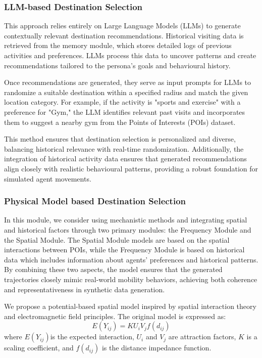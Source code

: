 \subsubsection{LLM-based Destination Selection}
This approach relies entirely on Large Language Models (LLMs) to generate contextually relevant destination recommendations. Historical visiting data is retrieved from the memory module, which stores detailed logs of previous activities and preferences. LLMs process this data to uncover patterns and create recommendations tailored to the persona's goals and behavioural history.

Once recommendations are generated, they serve as input prompts for LLMs to randomize a suitable destination within a specified radius and match the given location category. 
For example, if the activity is "sports and exercise" with a preference for "Gym," the LLM identifies relevant past visits and incorporates them to suggest a nearby gym from the Points of Interests (POIs) dataset.

This method ensures that destination selection is personalized and diverse, balancing historical relevance with real-time randomization. Additionally, the integration of historical activity data ensures that generated recommendations align closely with realistic behavioural patterns, providing a robust foundation for simulated agent movements.

\subsubsection{Physical Model based Destination Selection}
In this module, we consider using mechanistic methods and integrating spatial and historical factors through two primary modules: the Frequency Module and the Spatial Module. The Spatial Module models are based on the spatial interactions between POIs, while the Frequency Module is based on historical data which includes information about agents' preferences and historical patterns. By combining these two aspects, the model ensures that the generated trajectories closely mimic real-world mobility behaviors, achieving both coherence and representativeness in synthetic data generation.

We propose a potential-based spatial model inspired by spatial interaction theory and electromagnetic field principles. The original model is expressed as:
\begin{equation} 
    E(Y_{ij}) = K U_iV_jf(d_{ij})
\end{equation}
where $E(Y_{ij})$is the expected interaction, $U_i$ and $V_j$ are attraction factors, $K$ is a scaling coefficient, and $f(d_{ij})$ is the distance impedance function.

